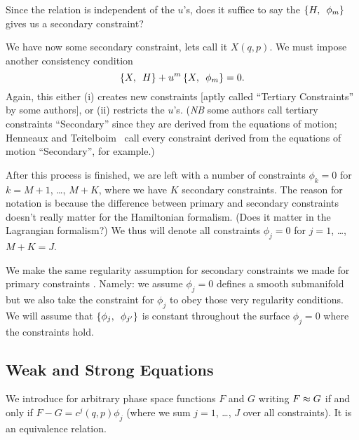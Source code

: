 \begin{puzzle}
Since the relation is independent of the $u$'s, does it suffice to say
the $\left\{H,\enspace\phi_{m}\right\}$ gives us a secondary constraint?
\end{puzzle}

We have now some secondary constraint, lets call it $X(q,p)$. We must
impose another consistency condition
\begin{equation}
\left\{X,\enspace H\right\}+u^{m}\left\{X,\enspace\phi_{m}\right\}=0.
\end{equation}
Again, this either (i) creates new constraints [aptly called ``Tertiary
  Constraints'' by some authors], or (ii) restricts the
$u$'s. (\emph{NB} some authors call tertiary constraints ``Secondary''
since they are derived from the equations of motion; Henneaux and
Teitelboim~\cite{Henneaux:1992ig} call every constraint derived from the
equations of motion ``Secondary'', for example.)

After this process is finished, we are left with a number of constraints
$\phi_{k}=0$ for $k=M+1$, \dots, $M+K$, where we have $K$ secondary
constraints. The reason for notation is because the difference between
primary and secondary constraints doesn't really matter for the
Hamiltonian formalism. (Does it matter in the Lagrangian formalism?) We
thus will denote all constraints $\phi_{j}=0$ for $j=1$, \dots,
$M+K=J$.

We make the same regularity assumption for secondary constraints we made
for primary constraints .
Namely: we assume $\phi_{j}=0$ defines a smooth submanifold but we also
take the constraint for $\phi_{j}$ to obey those very regularity
conditions. We will assume that $\left\{\phi_{j},\enspace\phi_{j'}\right\}$
is constant throughout the surface $\phi_{j}=0$ where the constraints
hold.

\subsection{Weak and Strong Equations}

\begin{defn}
We introduce  for arbitrary phase space functions
$F$ and $G$ writing $F\approx G$ if and only if $F-G = c^{j}(q,p)\phi_{j}$
(where we sum $j=1$, \dots, $J$ over all constraints). It is an
equivalence relation.
\end{defn}


